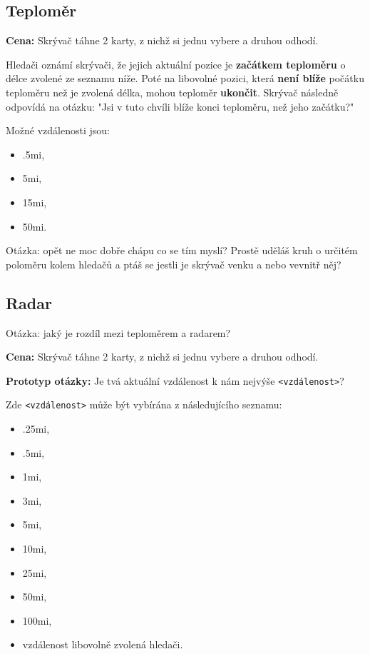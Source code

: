 \subsection{Teploměr}

\textbf{Cena:} Skrývač táhne 2 karty, z nichž si jednu vybere a druhou odhodí.

Hledači oznámí skrývači, že jejich aktuální pozice je \textbf{začátkem teploměru} o délce zvolené ze seznamu níže. Poté na libovolné pozici, která \textbf{není blíže} počátku teploměru než je zvolená délka, mohou teploměr \textbf{ukončit}. Skrývač následně odpovídá na otázku: "Jsi v tuto chvíli blíže konci teploměru, než jeho začátku?"

Možné vzdálenosti jsou:
\begin{itemize}
	\item \dist.5mi,
	\item \dist5mi,
	\item \dist15mi,
	\item \dist50mi.
\end{itemize}

Otázka: opět ne moc dobře chápu co se tím myslí? Prostě uděláš kruh o určitém poloměru kolem hledačů a ptáš se jestli je skrývač venku a nebo vevnitř něj?


\subsection{Radar}
Otázka: jaký je rozdíl mezi teploměrem a radarem?

\textbf{Cena:} Skrývač táhne 2 karty, z nichž si jednu vybere a druhou odhodí.

\textbf{Prototyp otázky:} Je tvá aktuální vzdálenost k nám nejvýše \verb|<vzdálenost>|?

Zde \verb|<vzdálenost>| může být vybírána z následujícího seznamu:
\begin{itemize}
	\item \dist.25mi,
	\item \dist.5mi,
	\item \dist1mi,
	\item \dist3mi,
	\item \dist5mi,
	\item \dist10mi,
	\item \dist25mi,
	\item \dist50mi,
	\item \dist100mi,
	\item vzdálenost libovolně zvolená hledači.
\end{itemize}

